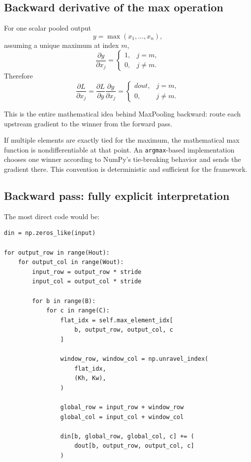 \documentclass[11pt,a4paper]{article}
\newcommand{\pd}[2]{\frac{\partial #1}{\partial #2}}
\newcommand{\code}[1]{\texttt{#1}}
\begin{document}
\subsection{Backward derivative of the max operation}

For one scalar pooled output
\[
y=\max(x_1,\ldots,x_n),
\]
assuming a unique maximum at index $m$,
\[
\pd{y}{x_j}
=
\begin{cases}
1,&j=m,\\
0,&j\ne m.
\end{cases}
\]
Therefore
\[
\pd{L}{x_j}
=
\pd{L}{y}\pd{y}{x_j}
=
\begin{cases}
dout,&j=m,\\
0,&j\ne m.
\end{cases}
\]

This is the entire mathematical idea behind MaxPooling backward: route each upstream gradient to the winner from the forward pass.

If multiple elements are exactly tied for the maximum, the mathematical max function is nondifferentiable at that point. An \code{argmax}-based implementation chooses one winner according to NumPy's tie-breaking behavior and sends the gradient there. This convention is deterministic and sufficient for the framework.

\subsection{Backward pass: fully explicit interpretation}

The most direct code would be:
\begin{lstlisting}
din = np.zeros_like(input)

for output_row in range(Hout):
    for output_col in range(Wout):
        input_row = output_row * stride
        input_col = output_col * stride

        for b in range(B):
            for c in range(C):
                flat_idx = self.max_element_idx[
                    b, output_row, output_col, c
                ]

                window_row, window_col = np.unravel_index(
                    flat_idx,
                    (Kh, Kw),
                )

                global_row = input_row + window_row
                global_col = input_col + window_col

                din[b, global_row, global_col, c] += (
                    dout[b, output_row, output_col, c]
                )
\end{lstlisting}
\end{document}
